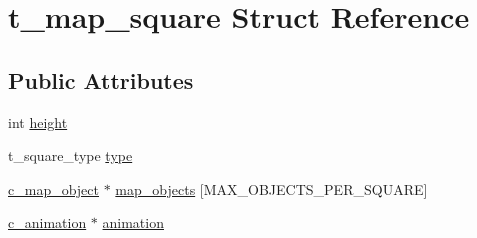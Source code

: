 \hypertarget{structt__map__square}{\section{t\-\_\-map\-\_\-square Struct Reference}
\label{structt__map__square}
}
\subsection*{Public Attributes}
\begin{DoxyCompactItemize}
\item 
int \hyperlink{structt__map__square_ad50f073f7cca47229656374c22daa9f8}{height}
\item 
t\-\_\-square\-\_\-type \hyperlink{structt__map__square_af17b226474485e797d61cce54a409666}{type}
\item 
\hyperlink{classc__map__object}{c\-\_\-map\-\_\-object} $\ast$ \hyperlink{structt__map__square_ac2715b549f3b3fb05bfb9b436d5cfc2d}{map\-\_\-objects} \mbox{[}M\-A\-X\-\_\-\-O\-B\-J\-E\-C\-T\-S\-\_\-\-P\-E\-R\-\_\-\-S\-Q\-U\-A\-R\-E\mbox{]}
\item 
\hyperlink{classc__animation}{c\-\_\-animation} $\ast$ \hyperlink{structt__map__square_a501ddc8f612fc58041bd1c7a11920a15}{animation}
\end{DoxyCompactItemize}


